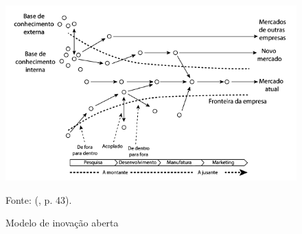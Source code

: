 \begin{figure}[H]
    \caption{Modelo de inovação aberta}
    \centering
    \includegraphics[width=\linewidth]{images/fundamentacao/modeloinovacaoaberta.png}
    \label{fig:modeloinovacaoaberta}
    
    Fonte: \citeauthor{chesbrough2014}(\citeyear{chesbrough2014}, p. 43).
\end{figure}